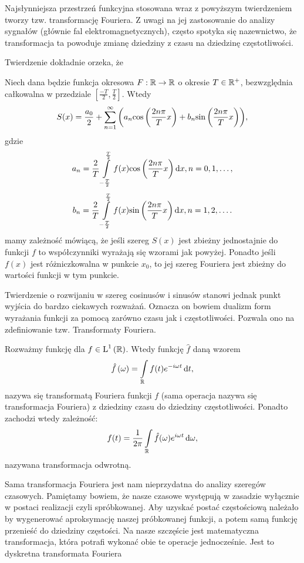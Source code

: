 \documentclass[10pt,a4paper]{book}
\begin{document}
Najsłynniejsza przestrzeń funkcyjna stosowana wraz z powyższym twierdzeniem tworzy tzw. transformację Fouriera. Z uwagi na jej zastosowanie do analizy sygnałów (głównie fal elektromagnetycznych), często spotyka się nazewnictwo, że transformacja ta powoduje zmianę dziedziny z czasu na dziedzinę częstotliwości. 

Twierdzenie dokładnie orzeka, że

\begin{theorem}
Niech dana będzie funkcja okresowa $F: \mathbb{R} \to \mathbb{R}$ o okresie $T \in \mathbb{R}^+$, bezwzględnia całkowalna w przedziale $[ \frac{-T}{2}, \frac{T}{2}]$. Wtedy
$$
S(x) = \frac{a_0}{2} + \sum_{n=1}^{\infty} \bracket{a_n \function{\cos}{\frac{2n\pi}{T}x} + b_n \function{\sin}{\frac{2n\pi}{T}x}},
$$
gdzie
$$
a_n = \frac{2}{T} \int_{-\frac{T}{2}}^{\frac{T}{2}} f(x) \function{\cos}{\frac{2 n \pi}{T} x} \dt[x], n = 0,1,\ldots ,
$$
$$
b_n = \frac{2}{T} \int_{-\frac{T}{2}}^{\frac{T}{2}} f(x) \function{\sin}{\frac{2 n \pi}{T} x} \dt[x], n = 1,2,\ldots.
$$
mamy zależność mówiącą, że jeśli szereg $S(x)$ jest zbieżny jednostajnie do funkcji $f$ to współczynniki wyrażają się wzorami jak powyżej. Ponadto jeśli $f(x) $ jest różniczkowalna w punkcie $x_0$, to jej szereg Fouriera jest zbieżny do wartości funkcji w tym punkcie.
\end{theorem}

Twierdzenie o rozwijaniu w szereg cosinusów i sinusów stanowi jednak punkt wyjścia do bardzo ciekawych rozważań. Oznacza on bowiem dualizm form wyrażania funkcji za pomocą zarówno czasu jak i częstotliwości. Pozwala ono na zdefiniowanie tzw. Transformaty Fouriera.

\begin{definition}
Rozważmy funkcję dla $f \in \Lp{1}{\setR}$. Wtedy funkcję $\hat{f}$ daną wzorem
$$
\function{\hat{f}}{\omega} = \int_{\setR } f(t) e^{-i\omega t} \dt [t],
$$
nazywa się transformatą Fouriera funkcji $f$ (sama operacja nazywa się transformacja Fouriera) z dziedziny czasu do dziedziny częstotliwości. 
Ponadto zachodzi wtedy zależność:
$$
f(t) = \frac{1}{2\pi} \int_{\setR } \hat{f}(\omega) e^{i\omega t}  \dt[\omega],
$$
nazywana transformacja odwrotną.
\end{definition}

Sama transformacja Fouriera jest nam nieprzydatna do analizy szeregów czasowych. Pamiętamy bowiem, że nasze czasowe występują w zasadzie wyłącznie w postaci realizacji czyli spróbkowanej. Aby uzyskać postać częstościową należało by wygenerować aproksymację naszej próbkowanej funkcji, a potem samą funkcję przenieść do dziedziny częstości. Na nasze szczęście jest matematyczna transformacja, która potrafi wykonać obie te operacje jednocześnie. Jest to dyskretna transformata Fouriera
\end{document}
